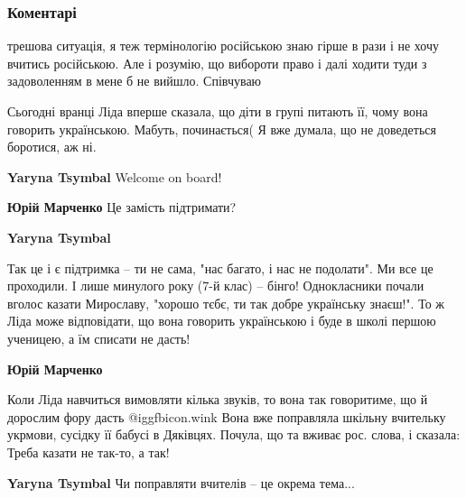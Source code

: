  
 
 
 
 
\subsubsection{Коментарі}
\label{sec:08_09_2021.fb.neborakova_bogdana.1.jazyk_institut_francia_kursy.cmt}

\begin{itemize} %

трешова ситуація, я теж термінологію російською знаю гірше в рази і не хочу
вчитись російською. Але і розумію, що вибороти право і далі ходити туди з
задоволенням в мене б не вийшло. Співчуваю


Сьогодні вранці Ліда вперше сказала, що діти в групі питають її, чому вона
говорить українською. Мабуть, починається( Я вже думала, що не доведеться
боротися, аж ні.

\begin{itemize} %
\textbf{Yaryna Tsymbal} Welcome on board!

\textbf{Юрій Марченко} Це замість підтримати?

\textbf{Yaryna Tsymbal} 

Так це і є підтримка – ти не сама, "нас багато, і нас не подолати". Ми все це
проходили. І лише минулого року (7-й клас) – бінго! Однокласники почали вголос
казати Мирославу, "хорошо тєбє, ти так добре українську знаєш!". То ж Ліда може
відповідати, що вона говорить українською і буде в школі першою ученицею, а їм
списати не дасть!

\textbf{Юрій Марченко} 

Коли Ліда навчиться вимовляти кілька звуків, то вона так говоритиме, що й
дорослим фору дасть  @igg{fbicon.wink}  Вона вже поправляла шкільну вчительку укрмови, сусідку
її бабусі в Дяківцях. Почула, що та вживає рос. слова, і сказала: Треба казати
не так-то, а так!

\textbf{Yaryna Tsymbal} Чи поправляти вчителів – це окрема тема...


\end{itemize}
\end{itemize}
